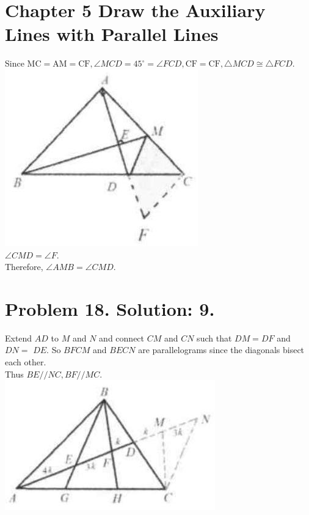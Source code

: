 \documentclass[10pt]{article}
\begin{document}
\section*{Chapter 5 Draw the Auxiliary Lines with Parallel Lines}
Since \(\mathrm{MC}=\mathrm{AM}=\mathrm{CF}, \angle M C D=45^{\circ}=\angle F C D, \mathrm{CF}=\mathrm{CF}, \triangle M C D \cong \triangle F C D\).\\
\includegraphics[max width=\textwidth, center]{2025_04_17_97bc1f7e44d93c271a88g-140(2)}\\
\(\angle C M D=\angle F\).\\
Therefore, \(\angle A M B=\angle C M D\).

\section*{Problem 18. Solution: 9.}
Extend \(A D\) to \(M\) and \(N\) and connect \(C M\) and \(C N\) such that \(D M=D F\) and \(D N=\) \(D E\). So \(B F C M\) and \(B E C N\) are parallelograms since the diagonals bisect each other.\\
Thus \(B E / / N C, B F / / M C\).\\
\includegraphics[max width=\textwidth, center]{2025_04_17_97bc1f7e44d93c271a88g-140(1)}
\end{document}
